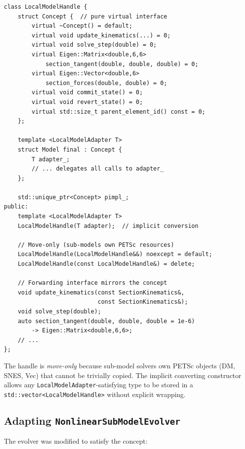 \begin{lstlisting}[caption={Type-erased handle (abridged).},
                   label={lst:local-model-handle}]
class LocalModelHandle {
    struct Concept {  // pure virtual interface
        virtual ~Concept() = default;
        virtual void update_kinematics(...) = 0;
        virtual void solve_step(double) = 0;
        virtual Eigen::Matrix<double,6,6>
            section_tangent(double, double, double) = 0;
        virtual Eigen::Vector<double,6>
            section_forces(double, double) = 0;
        virtual void commit_state() = 0;
        virtual void revert_state() = 0;
        virtual std::size_t parent_element_id() const = 0;
    };

    template <LocalModelAdapter T>
    struct Model final : Concept {
        T adapter_;
        // ... delegates all calls to adapter_
    };

    std::unique_ptr<Concept> pimpl_;
public:
    template <LocalModelAdapter T>
    LocalModelHandle(T adapter);  // implicit conversion

    // Move-only (sub-models own PETSc resources)
    LocalModelHandle(LocalModelHandle&&) noexcept = default;
    LocalModelHandle(const LocalModelHandle&) = delete;

    // Forwarding interface mirrors the concept
    void update_kinematics(const SectionKinematics&,
                           const SectionKinematics&);
    void solve_step(double);
    auto section_tangent(double, double, double = 1e-6)
        -> Eigen::Matrix<double,6,6>;
    // ...
};
\end{lstlisting}

The handle is \emph{move-only} because sub-model solvers own PETSc
objects (DM, SNES, Vec) that cannot be trivially copied.  The
implicit converting constructor allows any
\texttt{LocalModelAdapter}-satisfying type to be stored in a
\texttt{std::vector<LocalModelHandle>} without explicit wrapping.

\subsection{Adapting \texttt{NonlinearSubModelEvolver}}
\label{sec:refactor-evolver-adaptation}

The evolver was modified to satisfy the concept:

